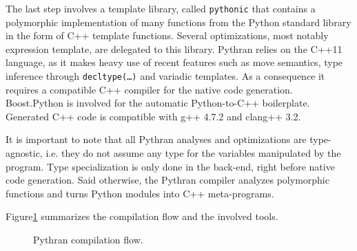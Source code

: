 \documentclass[10pt, onecolumn, preprint]{sigplanconf}
\begin{document}
The last step involves a template library, called \texttt{pythonic} that contains a
polymorphic implementation of many functions from the Python standard library
in the form of C++ template functions. Several optimizations, most notably
expression template, are delegated to this library. Pythran relies on the
C++11\cite{isocxx11} language, as it makes heavy use of recent features such as
move semantics, type inference through \texttt{decltype(\dots)} and variadic templates.
As a consequence it requires a compatible C++ compiler for the native code
generation. Boost.Python\cite{boostpython2007} is involved for the automatic
Python-to-C++ boilerplate.  Generated C++ code is compatible with g++ 4.7.2 and
clang++ 3.2.

It is important to note that all Pythran analyses and optimizations are
type-agnostic, i.e. they do not assume any type for the variables manipulated
by the program. Type specialization is only done in the back-end, right before
native code generation. Said otherwise, the Pythran compiler analyzes
polymorphic functions and turns Python modules into C++ meta-programs.

Figure\ref{fig:pythran-compiler} summarizes the compilation flow and the involved
tools.

\begin{figure}

    \centering
    
    \caption{Pythran compilation flow.}
    \label{fig:pythran-compiler}

\end{figure}
\end{document}

